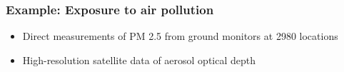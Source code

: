 \documentclass[10pt]{beamer}
\begin{document}
\begin{frame}

\frametitle{Example: Exposure to air pollution}

  \begin{itemize}
  \item Direct measurements of PM 2.5 from ground monitors at 2980
    locations
  \item High-resolution satellite data of aerosol optical depth
  \end{itemize}
  \begin{center}
\end{center}
\end{frame}
\end{document}
